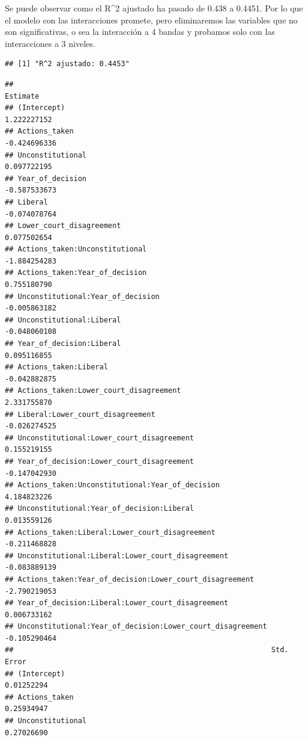 \documentclass[
]{article}
\begin{document}
Se puede observar como el R\^{}2 ajustado ha pasado de 0.438 a 0.4451.
Por lo que el modelo con las interacciones promete, pero eliminaremos
las variables que no son significativas, o sea la interacción a 4 bandas
y probamos solo con las interacciones a 3 niveles.

\begin{verbatim}
## [1] "R^2 ajustado: 0.4453"
\end{verbatim}

\begin{verbatim}
##                                                                Estimate
## (Intercept)                                                 1.222227152
## Actions_taken                                              -0.424696336
## Unconstitutional                                            0.097722195
## Year_of_decision                                           -0.587533673
## Liberal                                                    -0.074078764
## Lower_court_disagreement                                    0.077502654
## Actions_taken:Unconstitutional                             -1.884254283
## Actions_taken:Year_of_decision                              0.755180790
## Unconstitutional:Year_of_decision                          -0.005863182
## Unconstitutional:Liberal                                   -0.048060108
## Year_of_decision:Liberal                                    0.095116855
## Actions_taken:Liberal                                      -0.042882875
## Actions_taken:Lower_court_disagreement                      2.331755870
## Liberal:Lower_court_disagreement                           -0.026274525
## Unconstitutional:Lower_court_disagreement                   0.155219155
## Year_of_decision:Lower_court_disagreement                  -0.147042930
## Actions_taken:Unconstitutional:Year_of_decision             4.184823226
## Unconstitutional:Year_of_decision:Liberal                   0.013559126
## Actions_taken:Liberal:Lower_court_disagreement             -0.211468828
## Unconstitutional:Liberal:Lower_court_disagreement          -0.083889139
## Actions_taken:Year_of_decision:Lower_court_disagreement    -2.790219053
## Year_of_decision:Liberal:Lower_court_disagreement           0.006733162
## Unconstitutional:Year_of_decision:Lower_court_disagreement -0.105290464
##                                                            Std. Error
## (Intercept)                                                0.01252294
## Actions_taken                                              0.25934947
## Unconstitutional                                           0.27026690

\end{verbatim}
\end{document}
